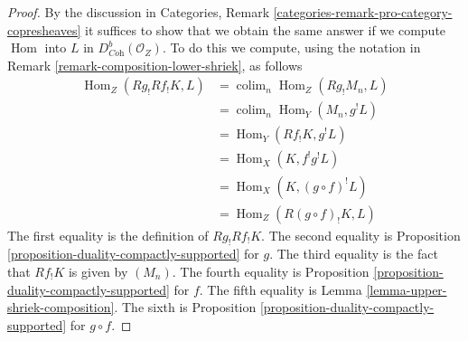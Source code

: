 \documentclass[10pt,a4paper]{amsart}
\theoremstyle{plain}
\theoremstyle{definition}
\theoremstyle{remark}
\numberwithin{equation}{subsection}
\def\colim{\mathop{\mathrm{colim}}\nolimits}
\def\Hom{\mathop{\mathrm{Hom}}\nolimits}
\begin{document}
\begin{proof}
By the discussion in
Categories, Remark \ref{categories-remark-pro-category-copresheaves}
it suffices to show that we obtain the same answer if we compute
$\Hom$ into $L$ in $D^b_{\textit{Coh}}(\mathcal{O}_Z)$. To do this
we compute, using the notation in
Remark \ref{remark-composition-lower-shriek}, as follows
\begin{align*}
\Hom_Z(Rg_!Rf_!K, L)
& =
\colim_n \Hom_Z(Rg_!M_n, L) \\
& =
\colim_n \Hom_Y(M_n, g^!L) \\
& =
\Hom_Y(Rf_!K, g^!L) \\
& =
\Hom_X(K, f^!g^!L) \\
& =
\Hom_X(K, (g \circ f)^!L) \\
& =
\Hom_Z(R(g \circ f)_!K, L)
\end{align*}
The first equality is the definition of $Rg_!Rf_!K$. The second
equality is Proposition \ref{proposition-duality-compactly-supported}
for $g$.
The third equality is the fact that $Rf_!K$ is given by $(M_n)$.
The fourth equality is
Proposition \ref{proposition-duality-compactly-supported} for $f$.
The fifth equality is Lemma \ref{lemma-upper-shriek-composition}.
The sixth is 
Proposition \ref{proposition-duality-compactly-supported} for $g \circ f$.
\end{proof}
\end{document}
